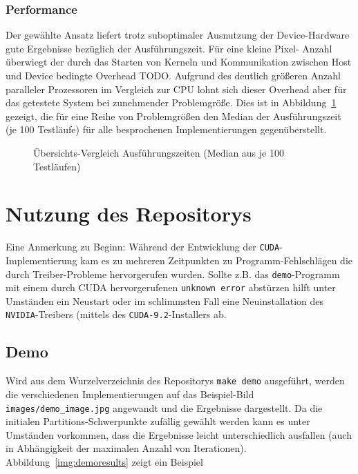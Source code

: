 \documentclass[
    bibliography=totoc, cd=lightcolor, cdmath=false, ngerman]{tudscrreprt}
\begin{document}
\subsection{Performance}

Der gewählte Ansatz liefert trotz suboptimaler Ausnutzung der Device-Hardware
gute Ergebnisse bezüglich der Ausführungszeit. Für eine kleine Pixel- Anzahl
überwiegt der durch das Starten von Kerneln und Kommunikation zwischen Host und
Device bedingte Overhead TODO. Aufgrund des deutlich größeren Anzahl paralleler
Prozessoren im Vergleich zur CPU lohnt sich dieser Overhead aber für das
getestete System bei zunehmender Problemgröße. Dies ist in
Abbildung~\ref{fig:all} gezeigt, die für eine Reihe von Problemgrößen den
Median der Ausführungszeit (je 100 Testläufe) für alle besprochenen
Implementierungen gegenüberstellt.

\begin{figure}[htbp]
  \centering
    
  \caption{Übersichts-Vergleich Ausführungszeiten (Median aus je 100 Testläufen)}
  \label{fig:all}
\end{figure}

\chapter{Nutzung des Repositorys}

Eine Anmerkung zu Beginn: Während der Entwicklung der
\texttt{CUDA}-Implementierung kam es zu mehreren Zeitpunkten zu
Programm-Fehlschlägen die durch Treiber-Probleme hervorgerufen wurden. Sollte
z.B. das \texttt{demo}-Programm mit einem durch CUDA hervorgerufenen
\texttt{unknown error} abstürzen hilft unter Umständen ein Neustart oder im
schlimmsten Fall eine Neuinstallation des \texttt{NVIDIA}-Treibers (mittels des
\texttt{CUDA-9.2}-Installers ab.

\section{Demo}

Wird aus dem Wurzelverzeichnis des Repositorys \texttt{make demo} ausgeführt,
werden die verschiedenen Implementierungen auf das Beispiel-Bild
\texttt{images/demo\_image.jpg} angewandt und die Ergebnisse dargestellt. Da
die initialen Partitions-Schwerpunkte zufällig gewählt werden kann es unter
Umständen vorkommen, dass die Ergebnisse leicht unterschiedlich ausfallen
(auch in Abhängigkeit der maximalen Anzahl von Iterationen).
Abbildung~\ref{img:demoresults} zeigt ein Beispiel
\end{document}
